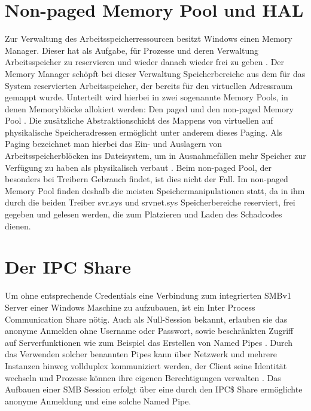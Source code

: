 \documentclass[DIV=12,headings=normal,pdftex,headinclude=false,footinclude=false,final]{scrreprt}
\begin{document}
\section{Non-paged Memory Pool und HAL}\label{sec:mempool}
Zur Verwaltung des Arbeitsspeicherressourcen besitzt Windows einen Memory Manager. Dieser hat als Aufgabe, für Prozesse und deren Verwaltung Arbeitsspeicher zu reservieren und wieder danach wieder frei zu geben \cite{Medium:ExpBible}. Der Memory Manager schöpft bei dieser Verwaltung Speicherbereiche aus dem für das System reservierten Arbeitsspeicher, der bereits für den virtuellen Adressraum gemappt wurde. Unterteilt wird hierbei in zwei sogenannte Memory Pools, in denen Memoryblöcke allokiert werden: Den paged und den non-paged Memory Pool \cite{MS:MemPools}. Die zusätzliche Abstraktionschicht des Mappens von virtuellen auf physikalische Speicheradressen ermöglicht unter anderem dieses Paging. Als Paging bezeichnet man hierbei das Ein- und Auslagern von Arbeitsspeicherblöcken ins Dateisystem, um in Ausnahmefällen mehr Speicher zur Verfügung zu haben als physikalisch verbaut \cite{CompWeek:Paging}. Beim non-paged Pool, der besonders bei Treibern Gebrauch findet, ist dies nicht der Fall. Im non-paged Memory Pool finden deshalb die meisten Speichermanipulationen statt, da in ihm durch die beiden Treiber svr.sys und srvnet.sys Speicherbereiche reserviert, frei gegeben und gelesen werden, die zum Platzieren und Laden des Schadcodes dienen\cite{SS:Eternal}.

\section{Der IPC Share}\label{sec:IPC}
Um ohne entsprechende Credentials eine Verbindung zum integrierten SMBv1 Server einer Windows Maschine zu aufzubauen, ist ein Inter Process Communication Share nötig. Auch als Null-Session bekannt, erlauben sie das anonyme Anmelden ohne Username oder Passwort, sowie beschränkten Zugriff auf Serverfunktionen wie zum Beispiel das Erstellen von Named Pipes \cite{MS:IPC}. Durch das Verwenden solcher benannten Pipes kann über Netzwerk und mehrere Instanzen hinweg vollduplex kommuniziert werden, der Client seine Identität wechseln und Prozesse können ihre eigenen Berechtigungen verwalten \cite{MS:NP}. Das Aufbauen einer SMB Session erfolgt über eine durch den IPC\$ Share ermöglichte anonyme Anmeldung und eine solche Named Pipe.


\end{document}
